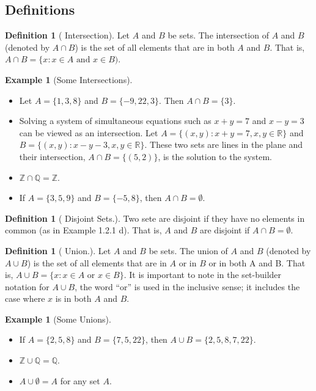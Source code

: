 \documentclass[10pt,]{book}
\theoremstyle{plain}
\theoremstyle{definition}
\newtheorem{definition}[theorem]{Definition}
\newtheorem{example}[theorem]{Example}
\begin{document}
\subsection[Definitions]{Definitions}\label{subsection-3}
\begin{definition}[ Intersection]\label{intersection}
 Let \(A\) and \(B\) be sets. The intersection of \(A\) and \(B\) (denoted by \(A \cap  B\)) is the set of all elements
that are in both \(A\) and \(B\). That is, \(A \cap  B = \{x:x \in  A \textrm{ and } x \in  B)\). 
\end{definition}
\label{notation-3}
\begin{example}[Some Intersections]\label{some_intersections}
\leavevmode%
\begin{itemize}[label=\textbullet]
\item{} Let \(A = \{1, 3, 8\}\) and \(B = \{-9, 22, 3\}\). Then \(A \cap  B = \{3\}\).\item{}Solving a system of simultaneous equations such as \(x + y = 7\) and \(x - y = 3\) can be viewed as an intersection. Let \(A = \{(x,y): x + y = 7, x,y \in  \mathbb{R}\}\) and \(B = \{(x,y): x - y - 3, x,y\in  \mathbb{R}\}\). These two sets are lines in the plane and their intersection,
\(A \cap  B = \{(5, 2)\}\), is the solution to the system. \item{} \(\mathbb{Z}\cap \mathbb{Q}=\mathbb{Z}\). \item{}If \(A = \{3, 5, 9\}\) and \(B = \{-5, 8\}\), then \(A\cap  B =\emptyset\). \end{itemize}
%
\end{example}
\begin{definition}[ Disjoint Sets.]\label{disjoint-sets.}
Two sete are disjoint if they have no elements in common (as in Example 1.2.1 d). That is, \(A\) and \(B\) are disjoint if \(A \cap  B = \emptyset\).
\end{definition}
\begin{definition}[ Union.]\label{union.}
 Let \(A\) and \(B\) be sets. The union of \(A\) and \(B\) (denoted by \(A \cup  B\)) is the set of all elements that are
in \(A\) or in \(B\) or in both A and B. That is, \(A\cup B= \{x:x \in  A\textrm{ or } x\in  B\}\). 
It is important to note in the set-builder notation for \(A\cup B\), the word ``or'' is used in the inclusive sense; it includes the case where
\( x\) is in both \(A\) and \(B\).
\end{definition}
\label{notation-4}
\begin{example}[Some Unions]\label{some_unions}
\leavevmode%
\begin{itemize}[label=\textbullet]
\item{} If \(A = \{2, 5, 8\}\) and  \(B = \{7, 5, 22\}\), then \(A \cup  B = \{2, 5, 8, 7, 22\}\). \item{} \(\mathbb{Z}\cup \mathbb{Q}=\mathbb{Q}.\) \item{} \(A \cup \emptyset  = A\) for any set \(A\).\end{itemize}
%
\end{example}
\end{document}
